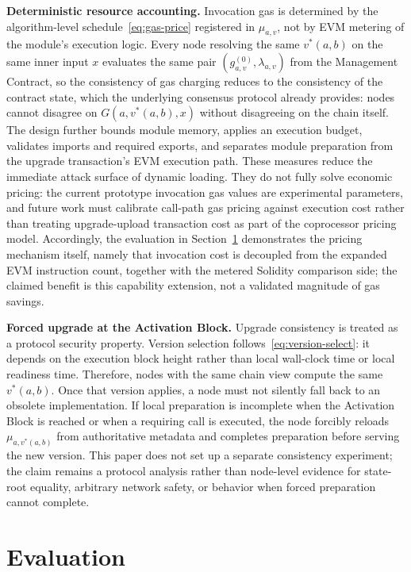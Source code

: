 \documentclass[pdflatex,sn-mathphys-num]{sn-jnl}%
\theoremstyle{thmstyleone}%
\theoremstyle{thmstyletwo}%
\theoremstyle{thmstylethree}%
\begin{document}
\noindent\textbf{Deterministic resource accounting.}
Invocation gas is determined by the algorithm-level schedule~\eqref{eq:gas-price} registered in $\mu_{a,v}$, not by EVM metering of the module's execution logic. Every node resolving the same $v^{*}(a,b)$ on the same inner input $x$ evaluates the same pair $(g^{(0)}_{a,v},\lambda_{a,v})$ from the Management Contract, so the consistency of gas charging reduces to the consistency of the contract state, which the underlying consensus protocol already provides: nodes cannot disagree on $G(a,v^{*}(a,b),x)$ without disagreeing on the chain itself. The design further bounds module memory, applies an execution budget, validates imports and required exports, and separates module preparation from the upgrade transaction's EVM execution path. These measures reduce the immediate attack surface of dynamic loading. They do not fully solve economic pricing: the current prototype invocation gas values are experimental parameters, and future work must calibrate call-path gas pricing against execution cost rather than treating upgrade-upload transaction cost as part of the coprocessor pricing model. Accordingly, the evaluation in Section~\ref{sec5} demonstrates the pricing mechanism itself, namely that invocation cost is decoupled from the expanded EVM instruction count, together with the metered Solidity comparison side; the claimed benefit is this capability extension, not a validated magnitude of gas savings.

\noindent\textbf{Forced upgrade at the Activation Block.}
Upgrade consistency is treated as a protocol security property. Version selection follows~\eqref{eq:version-select}: it depends on the execution block height rather than local wall-clock time or local readiness time. Therefore, nodes with the same chain view compute the same $v^{*}(a,b)$. Once that version applies, a node must not silently fall back to an obsolete implementation. If local preparation is incomplete when the Activation Block is reached or when a requiring call is executed, the node forcibly reloads $\mu_{a,v^{*}(a,b)}$ from authoritative metadata and completes preparation before serving the new version. This paper does not set up a separate consistency experiment; the claim remains a protocol analysis rather than node-level evidence for state-root equality, arbitrary network safety, or behavior when forced preparation cannot complete.

\section{Evaluation}\label{sec5}
\end{document}
